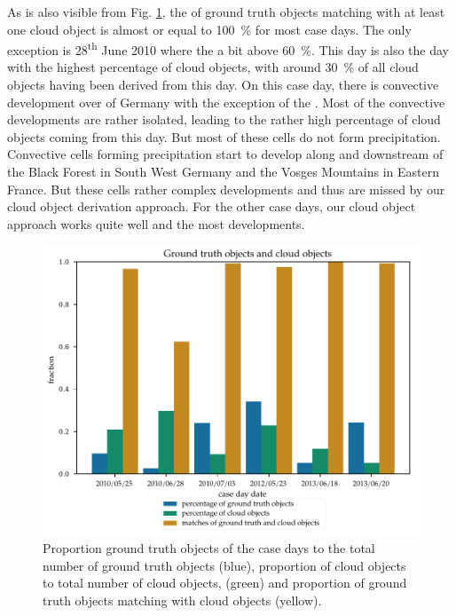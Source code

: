 As is also visible from Fig. \ref{fig:haci_frequency}, the  of ground truth objects matching with at least one cloud object is almost or equal to \SI{100}{\percent} for  most case days. The only exception is 28\textsuperscript{th} June 2010 where the  a bit above \SI{60}{\percent}. This day is also the day with the highest percentage of cloud objects, with around \SI{30}{\percent} of all cloud objects having been derived from this day. On this case day, there is convective development over  of Germany with the exception of the . Most of the convective developments are rather isolated, leading to the rather high percentage of cloud objects coming from this day. But  most of these cells do not form precipitation. Convective cells forming precipitation start to develop along and downstream of the Black Forest in South West Germany and the Vosges Mountains in Eastern France. But these cells  rather complex developments and thus are missed by our cloud object derivation approach.  For the other case days, our cloud object approach works quite well and  the most  developments.

\begin{figure}[htbp]
\centering
\includegraphics[width=\textwidth]{Grafiken/Abbildungen/haci_hrv_frequencies.pdf}
\caption{Proportion ground truth objects of the case days to the total number of ground truth objects (blue), proportion of cloud objects to total number of cloud objects, (green) and proportion of ground truth objects matching with cloud objects (yellow).}
\label{fig:haci_frequency}
\end{figure}

